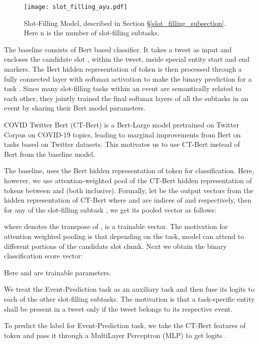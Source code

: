 \documentclass[11pt,a4paper]{article}
\begin{document}
\begin{figure}
\centering
\texttt{[image: slot\_filling\_ayu.pdf]}
    \caption{Slot-Filling Model, described in Section \S\ref{slot_filling_subsection}. Here n is the number of slot-filling subtasks. }
    \label{fig:model_slot}
\end{figure}

The baseline consists of Bert based classifier. It takes a tweet  as input and encloses the candidate slot , within the tweet, inside special entity start  and end  markers. The Bert hidden representation of token  is then processed through a fully connected layer with softmax activation to make the binary prediction for a task \cite{baldinisoares-etal-2019matching}. Since many slot-filling tasks within an event are semantically related to each other, they jointly trained the final softmax layers of all the subtasks  in an event by sharing their Bert model parameters.

COVID Twitter Bert (CT-Bert) is a Bert-Large model pretrained on Twitter Corpus on COVID-19 topics, leading to marginal improvements from Bert on tasks based on Twitter datasets\cite{ctbert}. This motivates us to use CT-Bert instead of Bert from the baseline model.

The baseline, uses the Bert hidden representation of token  for classification. Here, however, we use attention-weighted pool of the CT-Bert hidden representation of tokens between  and  (both inclusive). Formally, let  be the output vectors from the hidden representation of CT-Bert where  and  are indices of  and  respectively, then for any of the slot-filling subtask , we get its pooled vector as follows:




where  denotes the transpose of ,  is a trainable vector. The motivation for attention weighted pooling is that depending on the task, model can attend to different portions of the candidate slot chunk. Next we obtain the binary classification score vector:



Here  and  are trainable parameters.

We treat the Event-Prediction task as an auxiliary task and then fuse its logits to each of the other slot-filling subtasks. The motivation is that a task-specific entity shall be present in a tweet only if the tweet belongs to its respective event.

To predict the label for Event-Prediction task, we take the CT-Bert features of  token and pass it through a MultiLayer Perceptron (MLP) to get logits .
\end{document}
